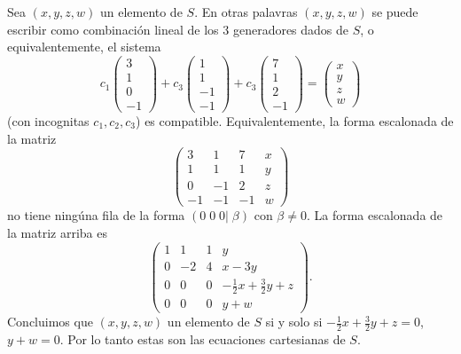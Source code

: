 \documentclass[12pt,a4paper]{report}
\theoremstyle{definition}
\begin{document}
Sea $(x,y,z,w)$ un elemento de $S$. En otras palavras $(x,y,z,w)$ se puede escribir 
como combinaci\'on lineal de los 3 generadores dados de $S$, o equivalentemente, el sistema
$$c_1
\left(\begin{array}{c}3 \\1 \\0 \\-1\end{array}\right)
+
c_3
\left(\begin{array}{c}1 \\1 \\-1 \\-1\end{array}\right)+
c_3
\left(\begin{array}{c}7 \\1 \\2 \\-1\end{array}\right)
=
\left(\begin{array}{c}x \\y \\z \\w\end{array}\right)
$$
(con incognitas $c_1,c_2,c_3$)
es compatible. Equivalentemente,
la forma escalonada de la matriz
$$
\left(\begin{array}{ccc|c}3 & 1 & 7 & x\\1 & 1 & 1 & y \\0 & -1 & 2 & z \\-1 & -1 & -1 & w\end{array}\right)$$
no tiene ning\'una fila de la forma $(0\;0\;0|\;\beta)$ con $\beta\neq 0$.
La forma escalonada de la matriz arriba es
$$
\left(\begin{array}{ccc|c}1 & 1 & 1 & y \\
0 & -2 & 4 & x-3y\\
0 & 0 & 0 & -\frac{1}{2}x+\frac{3}{2}y+z \\0 & 0 & 0 & y+w\end{array}\right).$$
Concluimos que $(x,y,z,w)$ un elemento de $S$ si y solo si
$-\frac{1}{2}x+\frac{3}{2}y+z=0$, $y+w=0$. Por lo tanto estas son las ecuaciones cartesianas de $S$.


  
 


 
\end{document}
